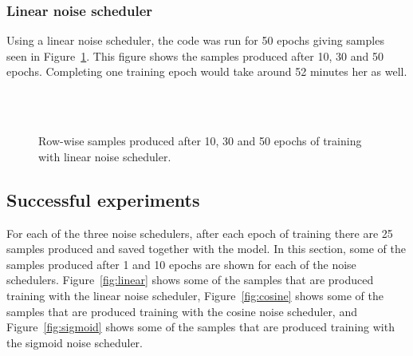 \documentclass[fullpaper]{nldl}
\begin{document}
\subsubsection{Linear noise scheduler}
\label{subsubsect:Res-linear_fail} 
Using a linear noise scheduler, the code was run for 50 epochs giving samples seen in Figure~\ref{fig:Failed-linear}. This figure shows the samples produced after 10, 30 and 50 epochs. Completing one training epoch would take around 52 minutes her as well.
\begin{figure}[h!]
	\centering
	\\
	\\
	\caption{Row-wise samples produced after 10, 30 and 50 epochs of training with linear noise scheduler. \label{fig:Failed-linear}}
\end{figure}


\subsection{Successful experiments}
\label{subsect:Res-exps}
For each of the three noise schedulers, after each epoch of training there are 25 samples produced and saved together with the model. In this section, some of the samples produced after 1 and 10 epochs are shown for each of the noise schedulers. Figure~\ref{fig:linear} shows some of the samples that are produced training with the linear noise scheduler, Figure~\ref{fig:cosine} shows some of the samples that are produced training with the cosine noise scheduler, and Figure~\ref{fig:sigmoid} shows some of the samples that are produced training with the sigmoid noise scheduler.
\end{document}
